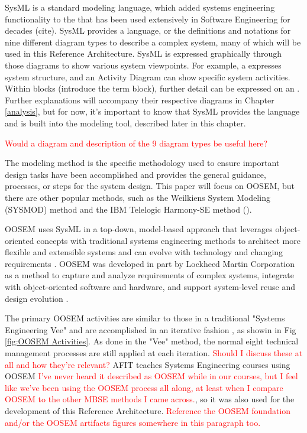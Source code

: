 SysML is a standard modeling language, which added systems engineering functionality to the  that has been used extensively in Software Engineering for decades (cite). SysML provides a language, or the definitions and notations for nine different diagram types to describe a complex system, many of which will be used in this Reference Architecture. SysML is expressed graphically through those diagrams to show various system viewpoints. For example, a  expresses system structure, and an Activity Diagram can show specific system activities. Within blocks (introduce the term block), further detail can be expressed on an . Further explanations will accompany their respective diagrams in Chapter \ref{analysis}, but for now, it's important to know that SysML provides the language and is built into the modeling tool, described later in this chapter. 

\textcolor{red}{Would a diagram and description of the 9 diagram types be useful here?}



The modeling method is the specific methodology used to ensure important design tasks have been accomplished and provides the general guidance, processes, or steps for the system design. This paper will focus on OOSEM, but there are other popular methods, such as the Weilkiens System Modeling (SYSMOD) method and the IBM Telelogic Harmony-SE method (\citeauthor{Delligatti}). 

OOSEM uses SysML in a top-down, model-based approach that leverages object-oriented concepts with traditional systems engineering methods to architect more flexible and extensible systems and can evolve with technology and changing requirements \citep{Estefan2008}. OOSEM was developed in part by Lockheed Martin Corporation as a method to capture and analyze requirements of complex systems, integrate with object-oriented software and hardware, and support system-level reuse and design evolution \citep{Estefan2008}.

The primary OOSEM activities are similar to those in a traditional "Systems Engineering Vee" and are accomplished in an iterative fashion \citep{OMGwiki}, as showin in Fig \ref{fig:OOSEM Activities}. As done in the "Vee" method, the normal eight technical management processes are still applied at each iteration. \textcolor{red}{Should I discuss these at all and how they're relevant?} AFIT teaches  Systems Engineering courses using OOSEM \textcolor{red}{I've never heard it described as OOSEM while in our courses, but I feel like we've been using the OOSEM process all along, at least when I compare OOSEM to the other MBSE methods I came across.}, so it was also used for the development of this Reference Architecture. \textcolor{red}{Reference the OOSEM foundation and/or the OOSEM artifacts figures somewhere in this paragraph too.}

